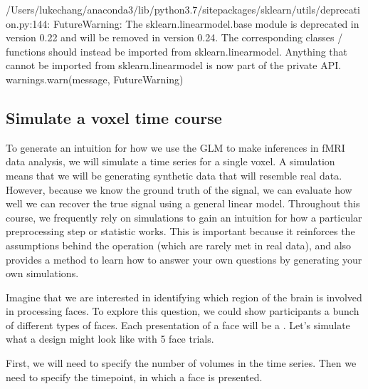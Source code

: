 \documentclass[letterpaper,10pt,english]{sphinxmanual}
\begin{document}
\begin{sphinxVerbatim}[commandchars=\\\{\}]
/Users/lukechang/anaconda3/lib/python3.7/site\PYGZhy{}packages/sklearn/utils/deprecation.py:144: FutureWarning: The sklearn.linear\PYGZus{}model.base module is  deprecated in version 0.22 and will be removed in version 0.24. The corresponding classes / functions should instead be imported from sklearn.linear\PYGZus{}model. Anything that cannot be imported from sklearn.linear\PYGZus{}model is now part of the private API.
  warnings.warn(message, FutureWarning)
\end{sphinxVerbatim}


\subsection{Simulate a voxel time course}
\label{\detokenize{content/GLM:simulate-a-voxel-time-course}}
To generate an intuition for how we use the GLM to make inferences in fMRI data analysis, we will simulate a time series for a single voxel. A simulation means that we will be generating synthetic data that will resemble real data. However, because we know the ground truth of the signal, we can evaluate how well we can recover the true signal using a general linear model. Throughout this course, we frequently rely on simulations to gain an intuition for how a particular preprocessing step or statistic works. This is important because it reinforces the assumptions behind the operation (which are rarely met in real data), and also provides a method to learn how to answer your own questions by generating your own simulations.

Imagine that we are interested in identifying which region of the brain is involved in processing faces. To explore this question, we could show participants a bunch of different types of faces. Each presentation of a face will be a . Let’s simulate what a design might look like with 5 face trials.

First, we will need to specify the number of volumes in the time series. Then we need to specify the timepoint, in which a face is presented.

\end{document}
